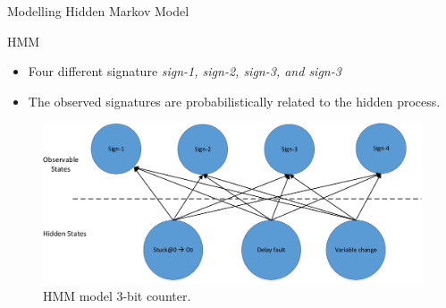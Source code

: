 \documentclass[aspectratio=1610]{beamer}
\begin{document}
\begin{frame}{Modelling Hidden Markov Model}

\begin{block}{HMM}

\end{block}

\begin{itemize}

\item Four different signature \textit{sign-1, sign-2, sign-3, and sign-3}

\item The observed signatures are probabilistically related to the hidden process. 


\end{itemize}




\begin{figure}[tb!]
 \centering
  \captionsetup{justification=centering}    
   \includegraphics[scale=0.5]{Figures/HMM.pdf}
   \caption{HMM model 3-bit counter.}
\label{fig:HMM-3-bit}
\end{figure}
\end{frame}
\end{document}
